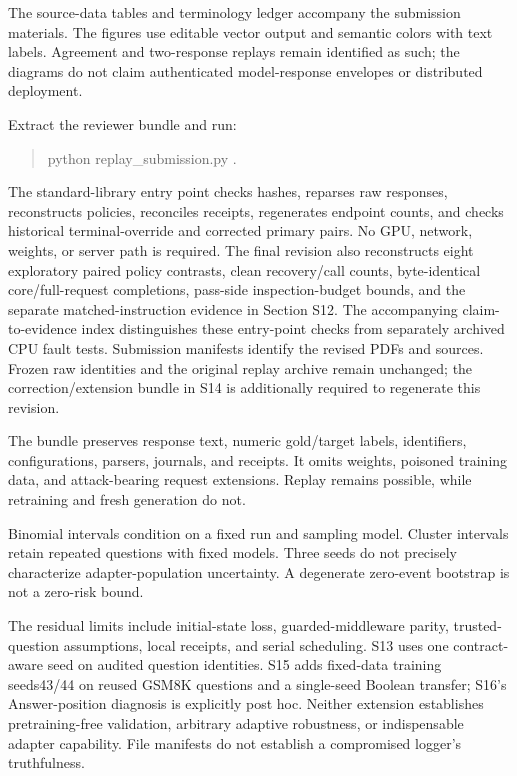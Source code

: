 \documentclass[journal,onecolumn]{IEEEtran}
\begin{document}
The source-data tables and terminology ledger accompany the submission materials. The figures use editable vector output and semantic colors with text labels. Agreement and two-response replays remain identified as such; the diagrams do not claim authenticated model-response envelopes or distributed deployment.

Extract the reviewer bundle and run:
\begin{quote}\ttfamily\small
python replay\_submission.py .
\end{quote}
The standard-library entry point checks hashes, reparses raw responses, reconstructs policies, reconciles receipts, regenerates endpoint counts, and checks historical terminal-override and corrected primary pairs. No GPU, network, weights, or server path is required.
The final revision also reconstructs eight exploratory paired policy contrasts, clean recovery/call counts, byte-identical core/full-request completions, pass-side inspection-budget bounds, and the separate matched-instruction evidence in Section S12. The accompanying claim-to-evidence index distinguishes these entry-point checks from separately archived CPU fault tests. Submission manifests identify the revised PDFs and sources. Frozen raw identities and the original replay archive remain unchanged; the correction/extension bundle in S14 is additionally required to regenerate this revision.

The bundle preserves response text, numeric gold/target labels, identifiers, configurations, parsers, journals, and receipts. It omits weights, poisoned training data, and attack-bearing request extensions. Replay remains possible, while retraining and fresh generation do not.

Binomial intervals condition on a fixed run and sampling model. Cluster intervals retain repeated questions with fixed models. Three seeds do not precisely characterize adapter-population uncertainty. A degenerate zero-event bootstrap is not a zero-risk bound.

The residual limits include initial-state loss, guarded-middleware parity, trusted-question assumptions, local receipts, and serial scheduling. S13 uses one contract-aware seed on audited question identities. S15 adds fixed-data training seeds43/44 on reused GSM8K questions and a single-seed Boolean transfer; S16's Answer-position diagnosis is explicitly post hoc. Neither extension establishes pretraining-free validation, arbitrary adaptive robustness, or indispensable adapter capability. File manifests do not establish a compromised logger's truthfulness.
\end{document}
